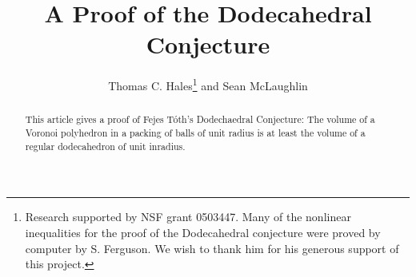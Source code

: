 \documentclass{llncs}
\begin{document}
\raggedbottom

\title{A Proof of the Dodecahedral Conjecture}
\author{Thomas C. Hales\thanks{Research supported by NSF grant 0503447.   Many of the nonlinear inequalities for the proof
of the Dodecahedral conjecture were proved by computer by S. Ferguson.  We
wish to thank him for his generous support of this project.} and Sean McLaughlin}
\maketitle

\begin{abstract}  
This article gives a proof of Fejes T\'oth's Dodechaedral Conjecture: The volume of a Voronoi polyhedron in a packing of balls of unit radius is at least the volume of a regular dodecahedron of unit inradius.
\end{abstract}




\end{document}
